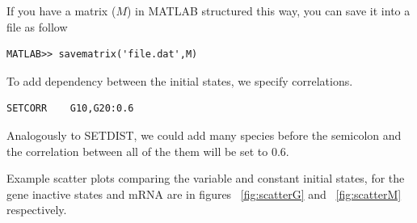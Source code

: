\documentclass[letterpaper]{article}
\begin{document}
If you have a matrix ($M$) in MATLAB structured this way, you can save
it into a file as follow
{\footnotesize
\begin{verbatim}
MATLAB>> savematrix('file.dat',M)
\end{verbatim}
}

To add dependency between the initial states, we specify correlations.
{\footnotesize
\begin{verbatim}
SETCORR    G10,G20:0.6
\end{verbatim}
}
Analogously to SETDIST, we could add many species before the semicolon
and the correlation between all of the them will be set to 0.6.

Example scatter plots comparing the variable and constant initial
states, for the gene inactive states and mRNA are in figures
~\ref{fig:scatterG} and ~\ref{fig:scatterM} respectively.
\end{document}
